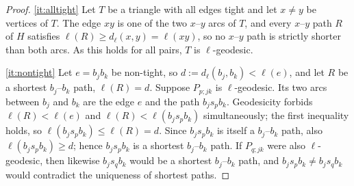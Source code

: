 \documentclass[11pt,a4paper]{article}
\theoremstyle{plain}
\theoremstyle{definition}
\theoremstyle{remark}
\newcommand{\dl}{d_\ell}
\begin{document}
\label{pf:tight}
\lemtight*
\begin{proof}
\ref{it:alltight} Let $T$ be a triangle with all edges tight and let $x\ne y$ be vertices of $T$. The edge $xy$ is one of the two $x$--$y$ arcs of $T$, and every $x$--$y$ path $R$ of $H$ satisfies $\ell(R)\ge\dl(x,y)=\ell(xy)$, so no $x$--$y$ path is strictly shorter than both arcs. As this holds for all pairs, $T$ is $\ell$-geodesic.

\ref{it:nontight} Let $e=b_jb_k$ be non-tight, so $d:=\dl(b_j,b_k)<\ell(e)$, and let $R$ be a shortest $b_j$--$b_k$ path, $\ell(R)=d$. Suppose $P_{p;jk}$ is $\ell$-geodesic. Its two arcs between $b_j$ and $b_k$ are the edge $e$ and the path $b_js_pb_k$. Geodesicity forbids $\ell(R)<\ell(e)$ and $\ell(R)<\ell(b_js_pb_k)$ simultaneously; the first inequality holds, so $\ell(b_js_pb_k)\le\ell(R)=d$. Since $b_js_pb_k$ is itself a $b_j$--$b_k$ path, also $\ell(b_js_pb_k)\ge d$; hence $b_js_pb_k$ is a shortest $b_j$--$b_k$ path. If $P_{q;jk}$ were also $\ell$-geodesic, then likewise $b_js_qb_k$ would be a shortest $b_j$--$b_k$ path, and $b_js_pb_k\ne b_js_qb_k$ would contradict the uniqueness of shortest paths.
\end{proof}
\end{document}
